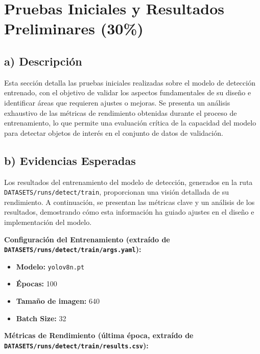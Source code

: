 \documentclass{article}
\begin{document}
\section{Pruebas Iniciales y Resultados Preliminares (30\%)}

\subsection{a) Descripción}

Esta sección detalla las pruebas iniciales realizadas sobre el modelo de detección entrenado, con el objetivo de validar los aspectos fundamentales de su diseño e identificar áreas que requieren ajustes o mejoras. Se presenta un análisis exhaustivo de las métricas de rendimiento obtenidas durante el proceso de entrenamiento, lo que permite una evaluación crítica de la capacidad del modelo para detectar objetos de interés en el conjunto de datos de validación.

\subsection{b) Evidencias Esperadas}

Los resultados del entrenamiento del modelo de detección, generados en la ruta \texttt{DATASETS/runs/detect/train}, proporcionan una visión detallada de su rendimiento. A continuación, se presentan las métricas clave y un análisis de los resultados, demostrando cómo esta información ha guiado ajustes en el diseño e implementación del modelo.

\textbf{Configuración del Entrenamiento (extraído de \texttt{DATASETS/runs/detect/train/args.yaml}):}
\begin{itemize}
    \item \textbf{Modelo:} \texttt{yolov8n.pt}
    \item \textbf{Épocas:} 100
    \item \textbf{Tamaño de imagen:} 640
    \item \textbf{Batch Size:} 32
\end{itemize}

\textbf{Métricas de Rendimiento (última época, extraído de \texttt{DATASETS/runs/detect/train/results.csv}):}
\end{document}
